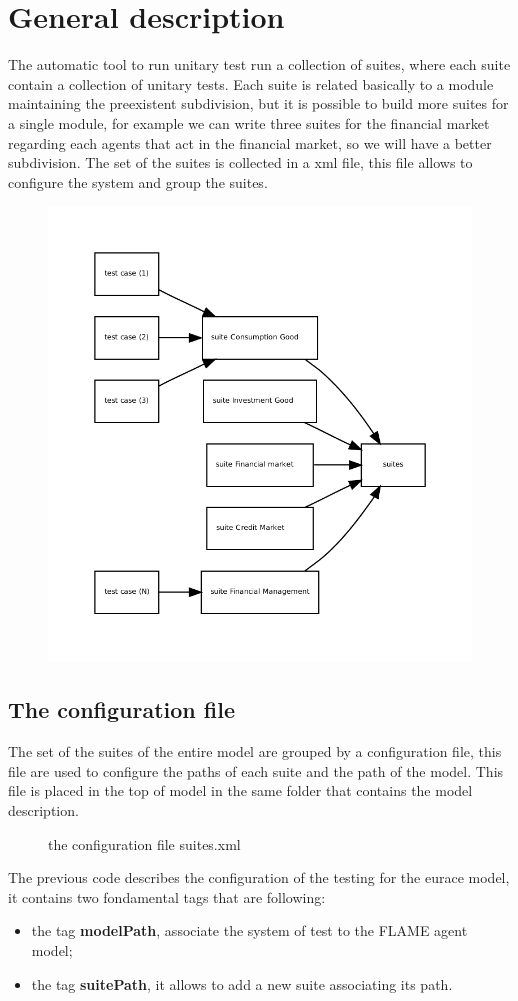 \documentclass[a4paper,10pt]{article}
\begin{document}
\section{General description}
The automatic tool to run unitary test run a collection of suites, 
where each suite contain a collection of unitary tests. 
Each suite is related basically to a module maintaining the preexistent subdivision, but it is possible to build more suites  for a single module, for example we can write three suites for the financial market regarding each agents that act in the financial market, so we will have a better subdivision. The set of the suites is collected in a xml file, this file allows to configure the system and group the suites.   
\begin{figure}
\centering
\includegraphics[scale=0.9]{graph/suites} 
\end{figure}
\subsection{The configuration file}
The set of the suites of the entire model are grouped by a configuration file, this file are used to configure the paths of each suite and the path of the model. This file is placed in the top of model in the same folder that contains the model description.
\begin{figure}
\label{fig:fig2}

\caption{the configuration file suites.xml}
\end{figure} 
The previous code describes the configuration of the testing for the eurace model, it contains two fondamental tags that are following:
\begin{itemize}
\item the tag \textbf{modelPath}, associate the system of test to the FLAME agent model;
\item the tag \textbf{suitePath}, it allows to add a new suite associating its path.
\end{itemize}
\end{document}
